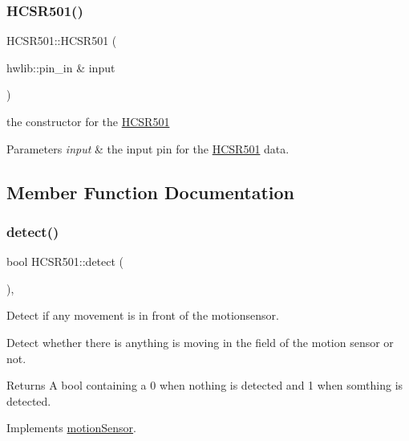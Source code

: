 \subsubsection{\texorpdfstring{H\+C\+S\+R501()}{HCSR501()}}
{\footnotesize\ttfamily H\+C\+S\+R501\+::\+H\+C\+S\+R501 (\begin{DoxyParamCaption}\item[{hwlib\+::pin\+\_\+in \&}]{input }\end{DoxyParamCaption})}



the constructor for the \mbox{\hyperlink{class_h_c_s_r501}{H\+C\+S\+R501}} 


\begin{DoxyParams}{Parameters}
{\em input} & the input pin for the \mbox{\hyperlink{class_h_c_s_r501}{H\+C\+S\+R501}} data. \\
\hline
\end{DoxyParams}


\subsection{Member Function Documentation}
\mbox{\label{class_h_c_s_r501_a75456a573bf0066ee648f8f1a39d4966}} 
\subsubsection{\texorpdfstring{detect()}{detect()}}
{\footnotesize\ttfamily bool H\+C\+S\+R501\+::detect (\begin{DoxyParamCaption}{ }\end{DoxyParamCaption})\hspace{0.3cm}{\ttfamily [override]}, {\ttfamily [virtual]}}



Detect if any movement is in front of the motionsensor. 

Detect whether there is anything is moving in the field of the motion sensor or not. \begin{DoxyReturn}{Returns}
A bool containing a 0 when nothing is detected and 1 when somthing is detected. 
\end{DoxyReturn}


Implements \mbox{\hyperlink{classmotion_sensor_a0b8701a41516d8b1140c39474b1db9db}{motion\+Sensor}}.

\mbox{\label{class_h_c_s_r501_a062d325c62157cc2b82d4a092caee2a1}} 

